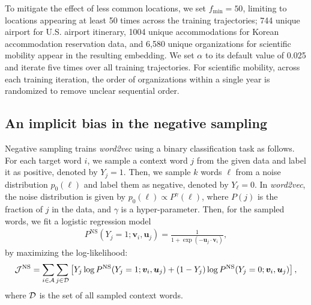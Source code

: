 \documentclass[12pt]{article} %
\newcommand{\vect}[1]{\boldsymbol{#1}}
\begin{document}
To mitigate the effect of less common locations, we set $f_{\min} = 50$, limiting to locations appearing at least 50 times across the training trajectories;
744 unique airport for U.S. airport itinerary, 1004 unique accommodations for Korean accommodation reservation data, and 6,580 unique organizations for scientific mobility appear in the resulting embedding.
We set $\alpha$ to its default value of 0.025 and iterate five times over all training trajectories.
For scientific mobility, across each training iteration, the order of organizations within a single year is randomized to remove unclear sequential order.


\subsection*{An implicit bias in the negative sampling}
\label{sec:sg_and_word2vec}

Negative sampling trains {\it word2vec} using a binary classification task as follows.
For each target word $i$, we sample a context word $j$ from the given data and label it as positive, denoted by $Y_{j}=1$.
Then, we sample $k$ words $\ell$ from a noise distribution $p_0(\ell)$ and label them as negative, denoted by $Y_{\ell}=0$.
In \textit{word2vec}, the noise distribution is given by $p_0(\ell) \propto P^\gamma (\ell)$, where $P(j)$ is the fraction of $j$ in the data, and $\gamma$ is a hyper-parameter.
Then, for the sampled words, we fit a logistic regression model
\begin{align}
	\label{eq:logistic-regress}
	P^{\text{NS}}(Y_{j} = 1; \vect{v}_{i}, \vect{u}_j) = \frac{1}{1 + \exp(-\vect{u}_j \cdot \vect{v}_{i})},
\end{align}
by maximizing the log-likelihood:
\begin{align}
	\label{eq:log-likelihood-logistic-regress}
	{\cal J}^{\text{NS}} = \sum_{i \in {\cal A}} \sum_{j \in {\cal D}} \left[ Y_{j} \log P^{\text{NS}}(Y_{j} = 1; \vect{v}_{i}, \vect{u}_j) + (1-Y_{j}) \log P^{\text{NS}}(Y_{j} = 0; \vect{v}_{i}, \vect{u}_j)\right],
\end{align}
where ${\cal D}$ is the set of all sampled context words.
\end{document}
